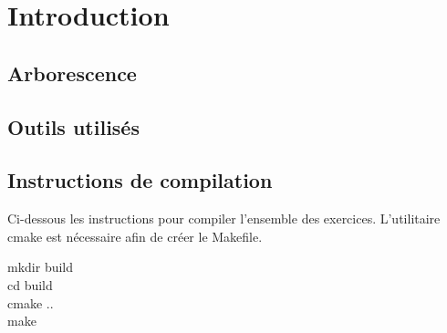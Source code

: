 \section{Introduction}

\subsection{Arborescence}

\subsection{Outils utilisés}

\subsection{Instructions de compilation}
Ci-dessous les instructions pour compiler l'ensemble des exercices. L'utilitaire cmake est nécessaire afin de créer le Makefile.

\begin{mdframed}[backgroundcolor=lightblue, linecolor=darkblue]
	mkdir build\\
	cd build\\
	cmake ..\\
	make
\end{mdframed}
